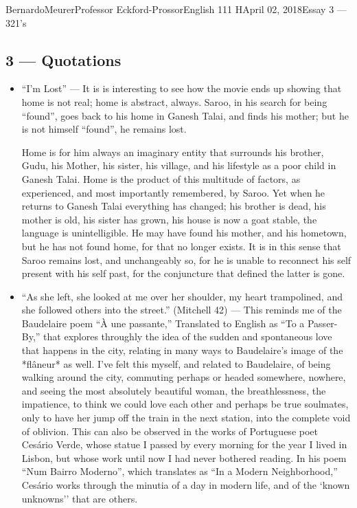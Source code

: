 \documentclass[12pt,letterpaper]{article}
\begin{document}
\begin{mla}{Bernardo}{Meurer}{Professor Eckford-Prossor}{English 111 H}{April 02, 2018}{Essay 3 --- 321's}
	\subsection*{3 --- Quotations}
	\begin{itemize}
		\item ``I'm Lost'' ---
		      It is is interesting to see how the movie ends up showing that home is not real; home is abstract, always. Saroo, in his search for being ``found'', goes back to his home in Ganesh Talai, and finds his mother; but he is not himself ``found'', he remains lost.

		      Home is for him always an imaginary entity that surrounds his brother, Gudu, his Mother, his sister, his village, and his lifestyle as a poor child in Ganesh Talai. Home is the product of this multitude of factors, as experienced, and most importantly remembered, by Saroo. Yet when he returns to Ganesh Talai everything has changed; his brother is dead, his mother is old, his sister has grown, his house is now a goat stable, the language is unintelligible. He may have found his mother, and his hometown,  but he has not found home, for that no longer exists. It is in this sense that Saroo remains lost, and unchangeably so, for he is unable to reconnect his self present with his self past, for the conjuncture that defined the latter is gone.
		\item ``As she left, she looked at me over her shoulder, my heart trampolined, and she followed others into the street.'' (Mitchell 42)
		      --- This reminds me of the Baudelaire poem ``À une passante,'' Translated to English as ``To a Passer-By,'' that explores throughly the idea of the sudden and spontaneous love that happens in the city, relating in many ways to Baudelaire's image of the *flâneur* as well. I've felt this myself, and related to Baudelaire, of being walking around the city, commuting perhaps or headed somewhere, nowhere, and seeing the most absolutely beautiful woman, the breathlessness, the impatience, to think we could love each other and perhaps be true soulmates, only to have her jump off the train in the next station, into the complete void of oblivion.
		      This can also be observed in the works of Portuguese poet Cesário Verde, whose statue I passed by every morning for the year I lived in Lisbon, but whose work until now I had never bothered reading. In his poem ``Num Bairro Moderno'', which translates as ``In a Modern Neighborhood,'' Cesário works through the minutia of a day in modern life, and of the `known unknowns'' that are others.

\end{itemize}
\end{mla}
\end{document}
